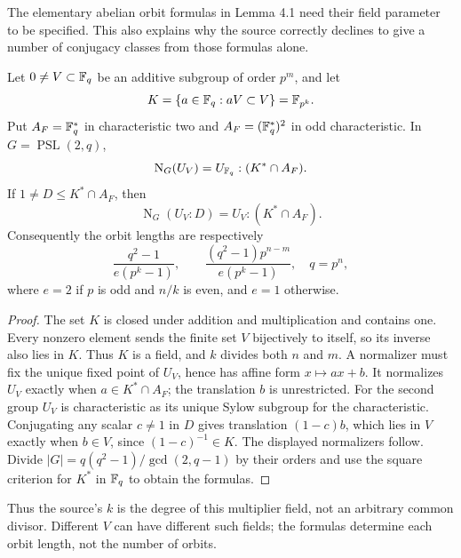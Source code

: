 \documentclass[11pt]{article}
\newcommand{\PSL}{\operatorname{PSL}}\newcommand{\PGL}{\operatorname{PGL}}
\newcommand{\N}{\operatorname{N}}
\begin{document}
The elementary abelian orbit formulas in Lemma 4.1 need their field
parameter to be specified. This also explains why the source correctly
declines to give a number of conjugacy classes from those formulas alone.
\begin{lemma}\label{multiplier}
Let $0\ne V\subset\mathbb F_q$ be an additive subgroup of order $p^m$,
and let
\[
 K=\{a\in\mathbb F_q:aV\subset V\}=\mathbb F_{p^k}.
\]
Put $A_F=\mathbb F_q^*$ in characteristic two and $A_F=(\mathbb F_q^*)^2$
in odd characteristic. In $G=\PSL(2,q)$,
\[
 \N_G(U_V)=U_{\F_q}:(K^*\cap A_F).
\]
If $1\ne D\le K^*\cap A_F$, then
\[
 \N_G(U_V:D)=U_V:(K^*\cap A_F).
\]
Consequently the orbit lengths are respectively
\[
 \frac{q^2-1}{e(p^k-1)},\qquad
 \frac{(q^2-1)p^{n-m}}{e(p^k-1)},
 \quad q=p^n,
\]
where $e=2$ if $p$ is odd and $n/k$ is even, and $e=1$ otherwise.
\end{lemma}
\begin{proof}
The set $K$ is closed under addition and multiplication and contains
one. Every nonzero element sends the finite set $V$ bijectively to
itself, so its inverse also lies in $K$. Thus $K$ is a field, and
$k$ divides both $n$ and $m$. A normalizer must fix the unique
fixed point of $U_V$, hence has affine form $x\mapsto ax+b$.
It normalizes $U_V$ exactly when $a\in K^*\cap A_F$; the
translation $b$ is unrestricted. For the second group $U_V$ is
characteristic as its unique Sylow subgroup for the characteristic.
Conjugating any scalar $c\ne1$ in $D$ gives translation
$(1-c)b$, which lies in $V$ exactly when $b\in V$, since
$(1-c)^{-1}\in K$. The displayed normalizers follow. Divide
$|G|=q(q^2-1)/\gcd(2,q-1)$ by their orders and use the square
criterion for $K^*$ in $\mathbb F_q$ to obtain the formulas.
\end{proof}
Thus the source's $k$ is the degree of this multiplier field, not an
arbitrary common divisor. Different $V$ can have different such fields;
the formulas determine each orbit length, not the number of orbits.
\end{document}
